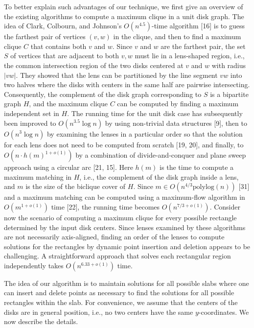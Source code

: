 To better explain such advantages of our technique, we first give an overview of the existing algorithms to compute a maximum clique in a unit disk graph. The idea of Clark, Colbourn, and Johnson’s $O(n^{4.5})$-time algorithm [16] is to guess the farthest pair of vertices $(v,w)$ in the clique, and then to find a maximum clique $C$ that contains both $v$ and $w$. Since $v$ and $w$ are the farthest pair, the set $S$ of vertices that are adjacent to both $v,w$ must lie in a lens-shaped region, i.e., the common intersection region of the two disks centered at $v$ and $w$ with radius $|vw|$. They showed that the lens can be partitioned by the line segment $vw$ into two halves where the disks with centers in the same half are pairwise intersecting. Consequently, the complement of the disk graph corresponding to $S$ is a bipartite graph $H$, and the maximum clique $C$ can be computed by finding a maximum independent set in $H$. The running time for the unit disk case has subsequently been improved to $O(n^{3.5}\log n)$ by using non-trivial data structures [9], then to $O(n^{3}\log n)$ by examining the lenses in a particular order so that the solution for each lens does not need to be computed from scratch [19, 20], and finally, to $O(n\cdot h(m)^{1+o(1)})$ by a combination of divide-and-conquer and plane sweep approach using a circular arc [21, 15]. Here $h(m)$ is the time to compute a maximum matching in $H$, i.e., the complement of the disk graph inside a lens, and $m$ is the size of the biclique cover of $H$. Since $m\in O(n^{4/3}\mathrm{polylog}(n))$ [31] and a maximum matching can be computed using a maximum-flow algorithm in $O(m^{1+o(1)})$ time [22], the running time becomes $O(n^{7/3+o(1)})$. Consider now the scenario of computing a maximum clique for every possible rectangle determined by the input disk centers. Since lenses examined by these algorithms are not necessarily axis-aligned, finding an order of the lenses to compute solutions for the rectangles by dynamic point insertion and deletion appears to be challenging. A straightforward approach that solves each rectangular region independently takes $O(n^{6.33+o(1)})$ time.
\par
\par
The idea of our algorithm is to maintain solutions for all possible slabs where one can insert and delete points as necessary to find the solutions for all possible rectangles within the slab. For convenience, we assume that the centers of the disks are in general position, i.e., no two centers have the same $y$-coordinates. We now describe the details.
